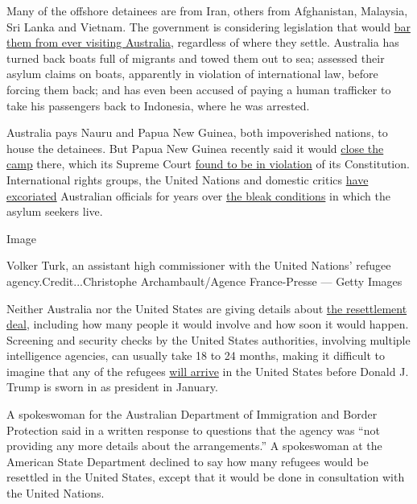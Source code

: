 Many of the offshore detainees are from Iran, others from Afghanistan,
Malaysia, Sri Lanka and Vietnam. The government is considering
legislation that would
\href{http://www.nytimes.com/2016/11/01/world/australia/refugee-asylum-seeker-lifetime-ban.html}{bar
them from ever visiting Australia}, regardless of where they settle.
Australia has turned back boats full of migrants and towed them out to
sea; assessed their asylum claims on boats, apparently in violation of
international law, before forcing them back; and has even been accused
of paying a human trafficker to take his passengers back to Indonesia,
where he was arrested.

Australia pays Nauru and Papua New Guinea, both impoverished nations, to
house the detainees. But Papua New Guinea recently said it would
\href{http://www.nytimes.com/2016/08/18/world/australia/manus-detention-center-papua-new-guinea.html}{close
the camp} there, which its Supreme Court
\href{http://www.nytimes.com/2016/04/27/world/australia/papua-new-guinea-asylum-seeker.html}{found
to be in violation} of its Constitution. International rights groups,
the United Nations and domestic critics
\href{http://www.nytimes.com/2016/08/04/world/australia/nauru-refugees-abuse-conditions.html}{have
excoriated} Australian officials for years over
\href{http://www.nytimes.com/2016/08/11/world/australia/nauru-asylum-seeker-refugee-abuse.html}{the
bleak conditions} in which the asylum seekers live.

Image

Volker Turk, an assistant high commissioner with the United Nations'
refugee agency.Credit...Christophe Archambault/Agence France-Presse ---
Getty Images

Neither Australia nor the United States are giving details about
\href{http://www.nytimes.com/2016/11/13/world/australia/australia-refugees-united-states.html}{the
resettlement deal}, including how many people it would involve and how
soon it would happen. Screening and security checks by the United States
authorities, involving multiple intelligence agencies, can usually take
18 to 24 months, making it difficult to imagine that any of the refugees
\href{http://www.nytimes.com/2016/11/18/world/australia/australia-us-refugee-deal.html}{will
arrive} in the United States before Donald J. Trump is sworn in as
president in January.

A spokeswoman for the Australian Department of Immigration and Border
Protection said in a written response to questions that the agency was
``not providing any more details about the arrangements.'' A spokeswoman
at the American State Department declined to say how many refugees would
be resettled in the United States, except that it would be done in
consultation with the United Nations.

